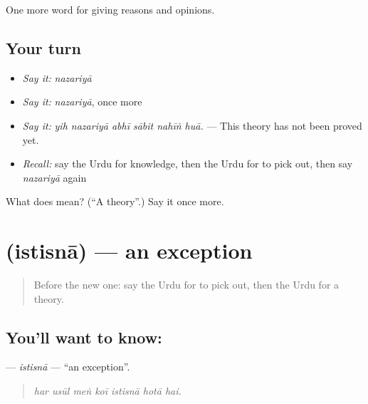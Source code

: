 \begin{grammarlens}[title={What you've built}]
One more word for giving reasons and opinions.
\end{grammarlens}

\subsection*{Your turn}
\begin{itemize}
\raggedright
  \item \emph{Say it:} \emph{nazariyā}
  \item \emph{Say it:} \emph{nazariyā}, once more
  \item \emph{Say it:} \emph{yih nazariyā abhī sābit nahīṅ huā.} — This theory has not been proved yet.
  \item \emph{Recall:} say the Urdu for knowledge, then the Urdu for to pick out, then say \emph{nazariyā} again
\end{itemize}

\begin{tcolorbox}[breakable,colback=teal!4,colframe=teal!35!black,title={Before you move on}]
What does  mean? (\textquotedblleft{}A theory\textquotedblright{}.) Say it once more.
\end{tcolorbox}
\section[\texorpdfstring{\ur{استثنا} (istisnā)}{استثنا (istisnā)}]{ (istisnā) — an exception}

\label{lesson:UR-C353-istisna}



\begin{quote}
Before the new one: say the Urdu for to pick out, then the Urdu for a theory.
\end{quote}

\subsection*{You'll want to know: }
\textbf{} — \emph{istisnā} — \textquotedblleft{}an exception\textquotedblright{}.

\begin{quote}
      
\end{quote}

\begin{quote}
\emph{har usūl meṅ koī istisnā hotā hai.}
\end{quote}

